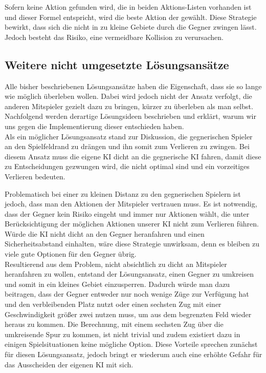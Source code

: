 Sofern keine Aktion gefunden wird, die in beiden Aktions-Listen vorhanden ist und dieser Formel entspricht, wird die
beste Aktion der  gewählt.
Diese Strategie bewirkt, dass sich die  nicht in zu kleine Gebiete durch die Gegner
zwingen lässt.
Jedoch besteht das Risiko, eine vermeidbare Kollision zu verursachen.

\subsection{Weitere nicht umgesetzte Lösungsansätze}
\label{subsec:weitere-loesungsansaetze}

Alle bisher beschriebenen Lösungsansätze haben die Eigenschaft, dass sie so lange wie möglich überleben wollen.
Dabei wird jedoch nicht der Ansatz verfolgt, die anderen Mitspieler gezielt dazu zu bringen, kürzer zu überleben als man
selbst.
Nachfolgend werden derartige Lösungsideen beschrieben und erklärt, warum wir uns gegen die Implementierung dieser
entschieden haben. \\

Als ein möglicher Lösungsansatz stand zur Diskussion, die gegnerischen Spieler an den Spielfeldrand zu drängen und ihn
somit zum Verlieren zu zwingen.
Bei diesem Ansatz muss die eigene KI dicht an die gegnerische \ac{KI} fahren, damit diese zu Entscheidungen gezwungen
wird, die nicht optimal sind und ein vorzeitiges Verlieren bedeuten.

Problematisch bei einer zu kleinen Distanz zu den gegnerischen Spielern ist jedoch, dass man den Aktionen der Mitspieler
vertrauen muss.
Es ist notwendig, dass der Gegner kein Risiko eingeht und immer nur Aktionen wählt, die unter Berücksichtigung der
möglichen Aktionen unserer \ac{KI} nicht zum Verlieren führen.
Würde die \ac{KI} nicht dicht an den Gegner heranfahren und einen Sicherheitsabstand einhalten, wäre diese Strategie
unwirksam, denn es bleiben zu viele gute Optionen für den Gegner übrig. \\

Resultierend aus dem Problem, nicht absichtlich zu dicht an Mitspieler heranfahren zu wollen, entstand der
Lösungsansatz, einen Gegner zu umkreisen und somit in ein kleines Gebiet einzusperren.
Dadurch würde man dazu beitragen, dass der Gegner entweder nur noch wenige Züge zur Verfügung hat und den verbleibenden
Platz nutzt oder einen sechsten Zug mit einer Geschwindigkeit größer zwei nutzen muss, um aus dem begrenzten Feld
wieder heraus zu kommen.
Die Berechnung, mit einem sechsten Zug über die umkreisende Spur zu kommen, ist nicht trivial und zudem existiert dazu
in einigen Spielsituationen keine mögliche Option.
Diese Vorteile sprechen zunächst für diesen Lösungsansatz, jedoch bringt er wiederum auch eine erhöhte Gefahr für das
Ausscheiden der eigenen \ac{KI} mit sich.

